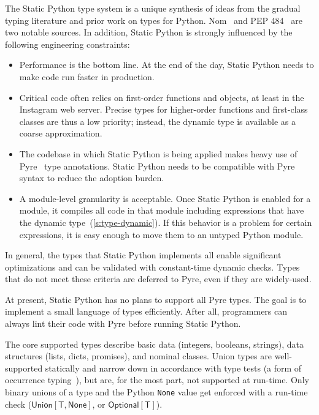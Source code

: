 \documentclass[english,cleveref,submission]{programming}
\newcommand{\SP}{Static Python}
\newcommand{\code}[1]{\texttt{#1}}
\newcommand{\typefont}[1]{\mathsf{#1}}
\newcommand{\paramtype}[2]{#1[#2]}
\newcommand{\sptype}{\typefont{T}}
\newcommand{\sptnone}{\typefont{None}}
\newcommand{\sptoptional}[1]{\paramtype{\typefont{Optional}}{#1}}
\newcommand{\sptunion}[1]{\paramtype{\typefont{Union}}{#1}}
\begin{document}
The \SP{} type system is a unique synthesis of ideas from the gradual typing literature
and prior work on types for Python.
Nom~\cite{mt-oopsla-2017,mt-oopsla-2021} and PEP 484~\cite{pep484} are two notable sources.
In addition, \SP{} is strongly influenced by the following engineering constraints:
\begin{itemize}
  \item
    Performance is the bottom line.
    At the end of the day, \SP{} needs to make code run faster in production.
  \item
    Critical code often relies on first-order functions and objects,
    at least in the Instagram web server.
    Precise types for higher-order functions and first-class classes
    are thus a low priority; instead, the dynamic type is available as a coarse
    approximation.
  \item
    The codebase in which \SP{} is being applied makes heavy use of Pyre~\cite{pyre}
    type annotations.
    \SP{} needs to be compatible with Pyre syntax to reduce the adoption burden.
  \item
    A module-level granularity is acceptable.
    Once \SP{} is enabled for a module, it compiles all code in that module
    including expressions that have the dynamic type~(\cref{s:type-dynamic}).
    If this behavior is a problem for certain expressions, it is easy enough to move
    them to an untyped Python module.
\end{itemize}
%
In general, the types that \SP{} implements all enable significant optimizations
and can be validated with constant-time dynamic checks.
Types that do not meet these criteria are deferred to Pyre, even if they are widely-used.

At present, \SP{} has no plans to support all Pyre types.
The goal is to implement a small language of types efficiently.
After all, programmers can always lint their code with Pyre before running
\SP{}.

The core supported types describe basic data (integers, booleans, strings),
data structures (lists, dicts, promises),
and nominal classes.
Union types are well-supported statically and narrow down in accordance
with type tests (a form of occurrence typing~\cite{tf-icfp-2010,gsk-esop-2011}),
but are, for the most part, not supported at run-time.
Only binary unions of a type and the Python \code{None} value get enforced with a run-time check
($\sptunion{\sptype, \sptnone}$, or $\sptoptional{\sptype}$).
\end{document}

